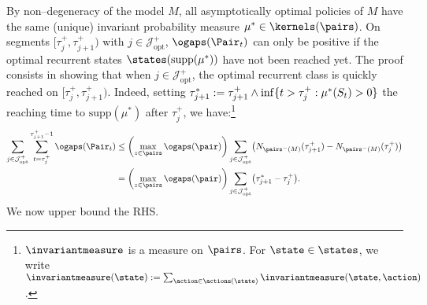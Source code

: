 \documentclass[preprint,cleveref,12pt]{colt2025}
\DeclarePairedDelimiter{\braces}{\{}{\}}	%
\DeclarePairedDelimiter{\parens}{(}{)}	%
\def\imeasure{\invariantmeasure}
\begin{document}
    By non--degeneracy of the model $M$, all asymptotically optimal policies of $M$ have the same (unique) invariant probability measure $\mu^* \in \kernels(\pairs)$.
    On segments $[\tau_j^+, \tau_{j+1}^+)$ with $j \in \mathcal{J}^+_\mathrm{opt}$, $\ogaps(\Pair_t)$ can only be positive if the optimal recurrent states $\states(\mathrm{supp}(\mu^*))$ have not been reached yet. 
    The proof consists in showing that when $j \in \mathcal{J}^+_\mathrm{opt}$, the optimal recurrent class is quickly reached on $[\tau_j^+, \tau_{j+1}^+)$. 
    Indeed, setting $\tau_{j+1}^* := \tau_{j+1}^+ \wedge \inf \braces{t > \tau_j^+ : \mu^*(S_t) > 0}$ the reaching time to $\mathrm{supp}(\mu^*)$ after $\tau_j^+$, we have:\footnote{$\imeasure$ is a measure on $\pairs$. For $\state \in \states$, we write $\imeasure(\state) := \sum_{\action \in \actions(\state)} \imeasure(\state,\action)$.}
    \begin{equation}
    \label{equation_coherence_optimal_segments_1}
    \begin{aligned}
        \sum_{j \in \mathcal{J}^+_\mathrm{opt}}
        \sum_{t=\tau_j^+}^{\tau_{j+1}^+-1}
        \ogaps(\Pair_t)
        & \le 
        \parens*{\max_{z \in \pairs} \ogaps(\pair)}
        \sum_{j \in \mathcal{J}^+_\mathrm{opt}} \parens*{N_{\pairs^-(M)}(\tau_{j+1}^+) - N_{\pairs^-(M)}(\tau_j^+)}
        \\
        & =
        \parens*{\max_{z \in \pairs} \ogaps(\pair)}
        \sum_{j \in \mathcal{J}^+_\mathrm{opt}} \parens*{\tau_{j+1}^* - \tau_j^+}
        .
    \end{aligned}
    \end{equation}
    We now upper bound the RHS.
\end{document}
